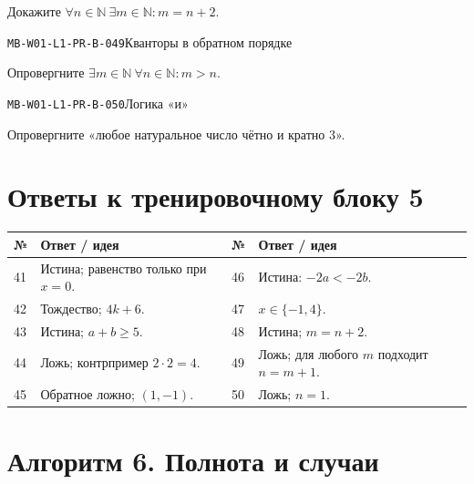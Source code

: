 \documentclass[11pt,a4paper,openany]{book}
\newcommand{\muid}[1]{\texttt{\footnotesize #1}}
\renewcommand{\arraystretch}{1.38}
\begin{document}
Докажите $\forall n\in\mathbb N\ \exists m\in\mathbb N\colon m=n+2$.\par\medskip

\noindent\hypertarget{MB-W01-L1-PR-B-049}{}\muid{MB-W01-L1-PR-B-049}\quad Кванторы в обратном порядке\par

Опровергните $\exists m\in\mathbb N\ \forall n\in\mathbb N\colon m>n$.\par\medskip

\noindent\hypertarget{MB-W01-L1-PR-B-050}{}\muid{MB-W01-L1-PR-B-050}\quad Логика «и»\par

Опровергните «любое натуральное число чётно и кратно $3$».\par\medskip

\clearpage\section*{Ответы к тренировочному блоку 5}


\begingroup\footnotesize\renewcommand{\arraystretch}{1.45}

\begin{tabularx}{\textwidth}{@{}p{10mm}X p{10mm}X@{}}\toprule № & Ответ / идея & № & Ответ / идея\\\midrule

41 & Истина; равенство только при $x=0$. & 46 & Истина: $-2a<-2b$.\\

42 & Тождество; $4k+6$. & 47 & $x\in\{-1,4\}$.\\

43 & Истина; $a+b\ge5$. & 48 & Истина; $m=n+2$.\\

44 & Ложь; контрпример $2\cdot2=4$. & 49 & Ложь; для любого $m$ подходит $n=m+1$.\\

45 & Обратное ложно; $(1,-1)$. & 50 & Ложь; $n=1$.\\

\bottomrule\end{tabularx}\endgroup

\clearpage{}

\section*{Алгоритм 6. Полнота и случаи}
\end{document}

